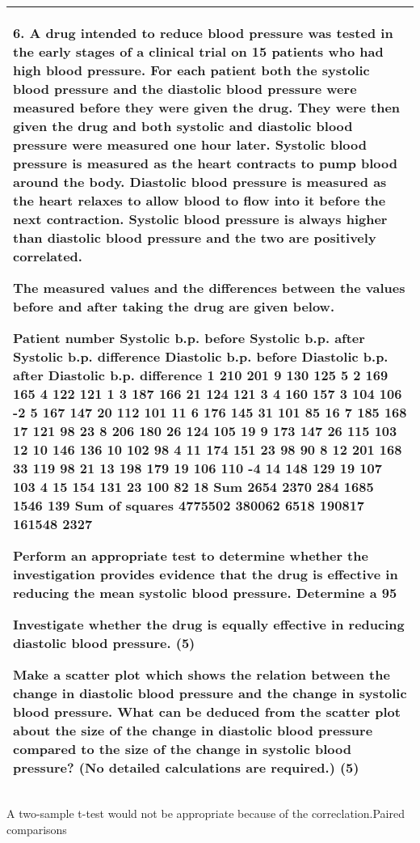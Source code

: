 \documentclass[a4paper,12pt]{article}
\begin{document}
\begin{table}[ht!]
 \centering
 \begin{tabular}{|p{15cm}|}
 \hline  
6. A drug intended to reduce blood pressure was tested in the early stages of a clinical trial on 15 patients who had high blood pressure.  For each patient both the systolic blood pressure and the diastolic blood pressure were measured before they were given the drug.  They were then given the drug and both systolic and diastolic blood pressure were measured one hour later.  Systolic blood pressure is measured as the heart contracts to pump blood around the body.  Diastolic blood pressure is measured as the heart relaxes to allow blood to flow into it before the next contraction.  Systolic blood pressure is always higher than diastolic blood pressure and the two are positively correlated. 
 
 The measured values and the differences between the values before and after taking the drug are given below. 
 
Patient number 
Systolic  b.p.  before 
Systolic  b.p.  after 
Systolic  b.p.  difference 
Diastolic  b.p.  before 
Diastolic  b.p.  after 
Diastolic  b.p. difference 
1 210 201 9 130 125 5 2 169 165 4 122 121 1 3 187 166 21 124 121 3 4 160 157 3 104 106 -2 5 167 147 20 112 101 11 6 176 145 31 101 85 16 7 185 168 17 121 98 23 8 206 180 26 124 105 19 9 173 147 26 115 103 12 10 146 136 10 102 98 4 11 174 151 23 98 90 8 12 201 168 33 119 98 21 13 198 179 19 106 110 -4 14 148 129 19 107 103 4 15 154 131 23 100 82 18 Sum 2654 2370 284 1685 1546 139 
Sum of squares 
4775502 380062 6518 190817 161548 2327 
 
Perform an appropriate test to determine whether the investigation provides evidence that the drug is effective in reducing the mean systolic blood pressure.  Determine a 95%
 
Investigate whether the drug is equally effective in reducing diastolic blood pressure. (5) 
 
Make a scatter plot which shows the relation between the change in diastolic blood pressure and the change in systolic blood pressure.  What can be deduced from the scatter plot about the size of the change in diastolic blood pressure compared to the size of the change in systolic blood pressure?  (No detailed calculations are required.) (5) \\ \hline
  \end{tabular}
\end{table} A two-sample t-test would not be appropriate because of the correclation.Paired comparisons
\end{document}
